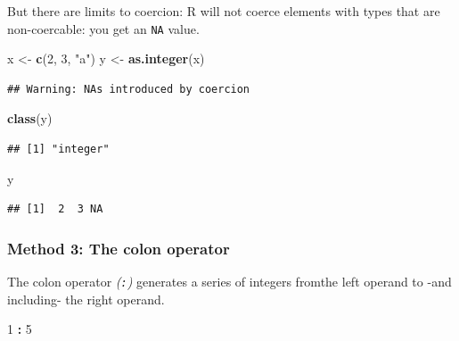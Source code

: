 \documentclass[]{book}
\newenvironment{Shaded}{\begin{snugshade}}{\end{snugshade}}
\newcommand{\DecValTok}[1]{\textcolor[rgb]{0.00,0.00,0.81}{#1}}
\newcommand{\KeywordTok}[1]{\textcolor[rgb]{0.13,0.29,0.53}{\textbf{#1}}}
\newcommand{\NormalTok}[1]{#1}
\newcommand{\OperatorTok}[1]{\textcolor[rgb]{0.81,0.36,0.00}{\textbf{#1}}}
\newcommand{\StringTok}[1]{\textcolor[rgb]{0.31,0.60,0.02}{#1}}
\begin{document}
But there are limits to coercion: R will not coerce elements with types that are non-coercable: you get an \texttt{NA} value.

\begin{Shaded}
\begin{Highlighting}[]
\NormalTok{x <-}\StringTok{ }\KeywordTok{c}\NormalTok{(}\DecValTok{2}\NormalTok{, }\DecValTok{3}\NormalTok{, }\StringTok{"a"}\NormalTok{)}
\NormalTok{y <-}\StringTok{ }\KeywordTok{as.integer}\NormalTok{(x)}
\end{Highlighting}
\end{Shaded}

\begin{verbatim}
## Warning: NAs introduced by coercion
\end{verbatim}

\begin{Shaded}
\begin{Highlighting}[]
\KeywordTok{class}\NormalTok{(y)}
\end{Highlighting}
\end{Shaded}

\begin{verbatim}
## [1] "integer"
\end{verbatim}

\begin{Shaded}
\begin{Highlighting}[]
\NormalTok{y}
\end{Highlighting}
\end{Shaded}

\begin{verbatim}
## [1]  2  3 NA
\end{verbatim}

\hypertarget{method-3-the-colon-operator}{%
\subsubsection*{Method 3: The colon operator}\label{method-3-the-colon-operator}}

The colon operator \emph{(\texttt{:})} generates a series of integers fromthe left operand to -and including- the right operand.

\begin{Shaded}
\begin{Highlighting}[]
\DecValTok{1} \OperatorTok{:}\StringTok{ }\DecValTok{5}
\end{Highlighting}
\end{Shaded}
\end{document}
